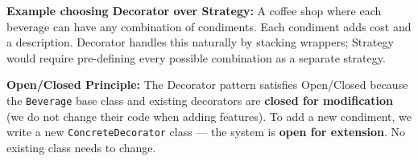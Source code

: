 \documentclass[twoside=false,DIV=14]{scrartcl}
\begin{document}
\textbf{Example choosing Decorator over Strategy:} A coffee shop where each beverage can have any combination of condiments.  Each condiment adds cost and a description.  Decorator handles this naturally by stacking wrappers; Strategy would require pre-defining every possible combination as a separate strategy.

\textbf{Open/Closed Principle:} The Decorator pattern satisfies Open/Closed because the \texttt{Beverage} base class and existing decorators are \textbf{closed for modification} (we do not change their code when adding features).  To add a new condiment, we write a new \texttt{ConcreteDecorator} class --- the system is \textbf{open for extension}.  No existing class needs to change.
\end{document}

